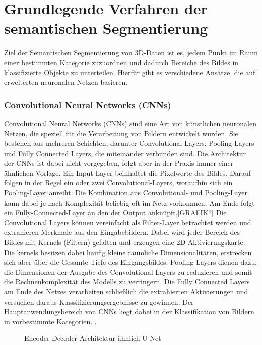 \chapter{Grundlegende Verfahren der semantischen Segmentierung}

Ziel der Semantischen Segmentierung von 3D-Daten ist es, jedem Punkt im Raum
einer bestimmten Kategorie zuzuordnen und dadurch Bereiche des Bildes in
klassifizierte Objekte zu unterteilen. Hierfür gibt es verschiedene Ansätze,
die auf erweiterten neuronalen Netzen basieren.

\subsection{Convolutional Neural Networks (CNNs)}
Convolutional Neural Networks (CNNs) sind eine Art von künstlichen neuronalen
Netzen, die speziell für die Verarbeitung von Bildern entwickelt wurden. Sie
bestehen aus mehreren Schichten, darunter Convolutional Layers, Pooling Layers
und Fully Connected Layers, die miteinander verbunden sind. Die Architektur der
CNNs ist dabei nicht vorgegeben, folgt aber in der Praxis immer einer ähnlichen
Vorlage. Ein Input-Layer beinhaltet die Pixelwerte des Bildes. Darauf folgen in
der Regel ein oder zwei Convolutional-Layers, woraufhin sich ein Pooling-Layer
anreiht. Die Kombination aus Convolutional- und Pooling-Layer kann dabei je
nach Komplexität beliebig oft im Netz vorkommen. Am Ende folgt ein
Fully-Connected-Layer an den der Output anknüpft.[GRAFIK?] Die Convolutional
Layers können vereinfacht als Filter-Layer betrachtet werden und extrahieren
Merkmale aus den Eingabebildern. Dabei wird jeder Bereich des Bildes mit
Kernels (Filtern) gefalten und erzeugen eine 2D-Aktivierungskarte. Die kernels
besitzen dabei häufig kleine räumliche Dimensionalitäten, erstrecken sich aber
über die Gesamte Tiefe des Eingangsbildes. Pooling Layers dienen dazu, die
Dimensionen der Ausgabe des Convolutional-Layers zu reduzieren und somit die
Rechnenkomplexität des Modells zu verringern. Die Fully Connected Layers am
Ende des Netzes verarbeiten schließlich die extrahierten Aktivierungen und
versuchen daraus Klassifizierungsergebnisse zu gewinnen. Der
Hauptanwendungsbereich von CNNs liegt dabei in der Klassifikation von Bildern
in vorbestimmte Kategorien. \cite{11262015}.


\begin{figure}
    \centering
       
    \caption{Encoder Decoder Architektur ähnlich U-Net}
    \label{fig:meinbild}
\end{figure}


